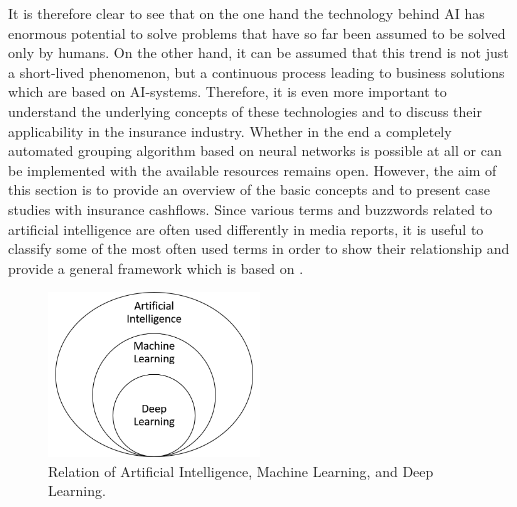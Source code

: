 It is therefore clear to see that on the one hand the technology behind AI has enormous potential to solve problems that have so far been assumed to be solved only by humans. On the other hand, it can be assumed that this trend is not just a short-lived phenomenon, but a continuous process leading to business solutions which are based on AI-systems. Therefore, it is even more important to understand the underlying concepts of these technologies and to discuss their applicability in the insurance industry. Whether in the end a completely automated grouping algorithm based on neural networks is possible at all or can be implemented with the available resources remains open. However, the aim of this section is to provide an overview of the basic concepts and to present case studies with insurance cashflows. Since various terms and buzzwords related to artificial intelligence are often used differently in media reports, it is useful to classify some of the most often used terms in order to show their relationship and provide a general framework which is based on \cite{Allaire2018}. 

\begin{figure}
	\centering
	\includegraphics[width=0.5\textwidth]{figures/chapter_NN/framework}
	\caption{Relation of Artificial Intelligence, Machine Learning, and Deep Learning.}
	\label{fig:framework}
\end{figure}

